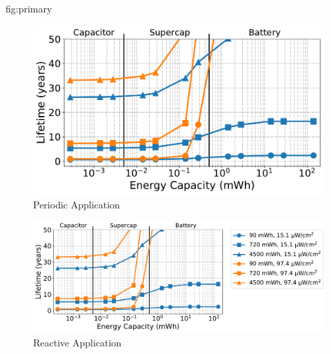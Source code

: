 \begin{definefigure*}{fig:primary}
  \centering
  \begin{subfigure}{0.39\textwidth}
    \centering
    \includegraphics[width=0.85\linewidth]{figs/capacity/primary/sense_and_send_life_vs_sec_size}
    \caption{Periodic Application}
    \label{fig:primary:sensesec}
  \end{subfigure}
  \begin{subfigure}{0.6\textwidth}
    \centering
    \includegraphics[width=0.85\linewidth]{figs/capacity/primary/door_occu_life_vs_sec_size}
      \caption{Reactive Application}
    \label{fig:primary:eventsec}
  \end{subfigure}
  \caption{
    \normalfont
    Estimated lifetime
    when varying secondary energy capacity for different harvesting scenarios
    and backup energy storage sizes. The periodic application's period
    is 30\,s and the reactive application events are scaled to
    represent a maximum of 2000 events per hour.
    The backup
    sizes correspond to those found in common coin cell batteries:
    90\,mWh, 720\,mWh, 4500\,mWh for the CR927, CR2032, and CR123A respectively.
    As the ability to capture
    more harvested energy increases, the sensors lifetime increases.
    In some scenarios, expected
    lifetime becomes unbounded as the device is able to subsist entirely on harvested
    energy.
    We see a 2-4x increase in lifetime estimates from the smallest to largest
    capacity simulated, if we only consider bounded results.
    We emphasize that
    these lifetime estimations are
    just estimations, and while we do model the 1\,\%/year leakage
    typical of coin cells, we do not consider the unknown
    physical degradation that would be experienced over decades of use.
    }
\end{definefigure*}

